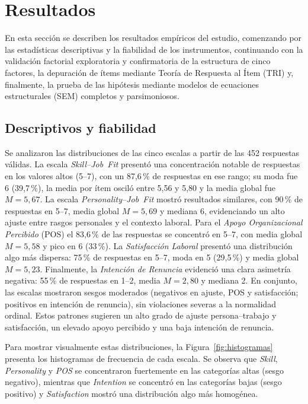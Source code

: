 \section{Resultados}

En esta sección se describen los resultados empíricos del estudio, comenzando por las estadísticas descriptivas y la fiabilidad de los instrumentos, continuando con la validación factorial exploratoria y confirmatoria de la estructura de cinco factores, la depuración de ítems mediante Teoría de Respuesta al Ítem (TRI) y, finalmente, la prueba de las hipótesis mediante modelos de ecuaciones estructurales (SEM) completos y parsimoniosos.

\subsection{Descriptivos y fiabilidad}
Se analizaron las distribuciones de las cinco escalas a partir de las 452 respuestas válidas. La escala \emph{Skill--Job Fit} presentó una concentración notable de respuestas en los valores altos (5–7), con un 87,6\,\% de respuestas en ese rango; su moda fue 6 (39,7\,\%), la media por ítem osciló entre 5,56 y 5,80 y la media global fue $M=5{,}67$. La escala \emph{Personality--Job Fit} mostró resultados similares, con 90\,\% de respuestas en 5–7, media global $M=5{,}69$ y mediana 6, evidenciando un alto ajuste entre rasgos personales y el contexto laboral. Para el \emph{Apoyo Organizacional Percibido} (POS) el 83,6\,\% de las respuestas se concentró en 5–7, con media global $M=5{,}58$ y pico en 6 (33\,\%). La \emph{Satisfacción Laboral} presentó una distribución algo más dispersa: 75\,\% de respuestas en 5–7, moda en 5 (29,5\,\%) y media global $M=5{,}23$. Finalmente, la \emph{Intención de Renuncia} evidenció una clara asimetría negativa: 55\,\% de respuestas en 1–2, media $M=2{,}80$ y mediana 2. En conjunto, las escalas mostraron sesgos moderados (negativos en ajuste, POS y satisfacción; positivos en intención de renuncia), sin violaciones severas a la normalidad ordinal. Estos patrones sugieren un alto grado de ajuste persona–trabajo y satisfacción, un elevado apoyo percibido y una baja intención de renuncia.

Para mostrar visualmente estas distribuciones, la Figura \ref{fig:histogramas} presenta los histogramas de frecuencia de cada escala. Se observa que \emph{Skill}, \emph{Personality} y \emph{POS} se concentraron fuertemente en las categorías altas (sesgo negativo), mientras que \emph{Intention} se concentró en las categorías bajas (sesgo positivo) y \emph{Satisfaction} mostró una distribución algo más homogénea.

